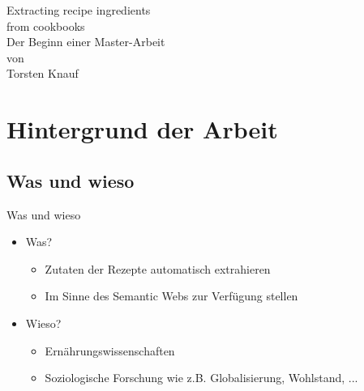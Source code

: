 \documentclass[12pt]{beamer}
\begin{document}
\begin{frame}
\begin{minipage}{0.25\textwidth}
	\end{minipage}
	\begin{minipage}{0.7\textwidth}
		\begin{center}
			\vspace{-1.5cm}
			\Large{Extracting recipe ingredients \\ from cookbooks} \\
			\vspace{0.5cm}
			\large{Der Beginn einer Master-Arbeit} \\
			\small{von \\ \vspace{-0.1cm} Torsten Knauf}
		\end{center}
	\end{minipage}
\end{frame}

\begin{frame}
	\tableofcontents
\end{frame}

\section{Hintergrund der Arbeit}
\subsection{Was und wieso}
\begin{frame}{Was und wieso}
	\begin{itemize}
		\item Was?
		\begin{itemize}
			\item Zutaten der Rezepte automatisch extrahieren
			\item Im Sinne des Semantic Webs zur Verfügung stellen 
		\end{itemize}
		\item Wieso?
		\begin{itemize}
			\item Ernährungswissenschaften
			\item Soziologische Forschung wie z.B. Globalisierung, Wohlstand, ...
		\end{itemize}
	\end{itemize}
\end{frame}
\end{document}
